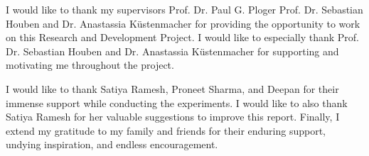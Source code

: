 




    \begin{acknowledgements}
        I would like to thank my supervisors Prof. Dr. Paul G. Ploger Prof. Dr. Sebastian Houben and Dr. Anastassia Küstenmacher for providing the opportunity to work on this Research and Development
        Project. I would like to especially thank Prof. Dr. Sebastian Houben and Dr. Anastassia Küstenmacher  for supporting and
        motivating me throughout the project. 
        
        I would like to thank Satiya Ramesh, Proneet Sharma, and
        Deepan  for their immense support while conducting the experiments. I
        would like to also thank Satiya Ramesh for her valuable
        suggestions to improve this report.
        Finally, I extend my gratitude to my family and friends for their enduring support,
        undying inspiration, and endless encouragement.
    \end{acknowledgements}

